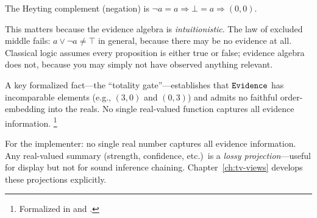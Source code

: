 \documentclass[11pt,openany]{report}
\begin{document}
The Heyting complement (negation) is $\neg a = a \Rightarrow \bot = a \Rightarrow (0,0)$.

This matters because the evidence algebra is \emph{intuitionistic}.
The law of excluded middle fails:
$a \vee \neg a \ne \top$ in general, because there may be no evidence at all.
Classical logic assumes every proposition is either true or false; evidence
algebra does not, because you may simply not have observed anything relevant.

A key formalized fact---the ``totality gate''---establishes that
$\mathtt{Evidence}$ has incomparable elements (e.g., $(3, 0)$ and $(0, 3)$) and
admits no faithful order-embedding into the reals.  No single real-valued
function captures all evidence information.%
\footnote{Formalized in  and
.}

For the implementer: no single real number captures all evidence
information.  Any real-valued summary (strength, confidence, etc.)\ is
a \emph{lossy projection}---useful for display but not for sound
inference chaining.  Chapter~\ref{ch:tv-views} develops these projections
explicitly.
\end{document}
